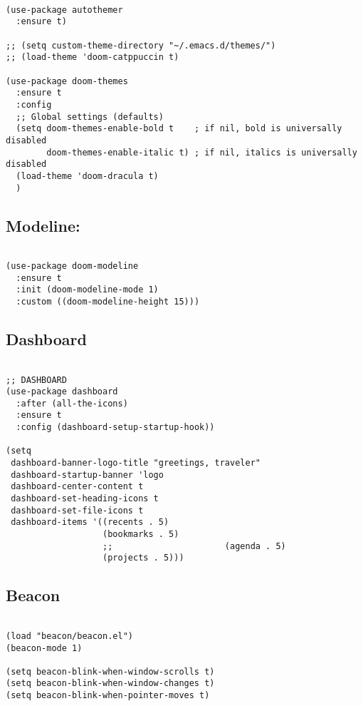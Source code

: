 \documentclass[11pt]{article}
\begin{document}
\begin{verbatim}

(use-package autothemer
  :ensure t)

;; (setq custom-theme-directory "~/.emacs.d/themes/")
;; (load-theme 'doom-catppuccin t)

(use-package doom-themes
  :ensure t
  :config
  ;; Global settings (defaults)
  (setq doom-themes-enable-bold t    ; if nil, bold is universally disabled
		doom-themes-enable-italic t) ; if nil, italics is universally disabled
  (load-theme 'doom-dracula t)
  )

\end{verbatim}

\subsection{Modeline:}
\label{sec:org02f56b0}

\begin{verbatim}

(use-package doom-modeline
  :ensure t
  :init (doom-modeline-mode 1)
  :custom ((doom-modeline-height 15)))

\end{verbatim}

\subsection{Dashboard}
\label{sec:org71d7e2f}

\begin{verbatim}

;; DASHBOARD
(use-package dashboard
  :after (all-the-icons)
  :ensure t
  :config (dashboard-setup-startup-hook))

(setq
 dashboard-banner-logo-title "greetings, traveler"
 dashboard-startup-banner 'logo
 dashboard-center-content t
 dashboard-set-heading-icons t
 dashboard-set-file-icons t
 dashboard-items '((recents . 5)
				   (bookmarks . 5)
				   ;;                      (agenda . 5)
				   (projects . 5)))

\end{verbatim}

\subsection{Beacon}
\label{sec:org69b1530}
\begin{verbatim}

(load "beacon/beacon.el")
(beacon-mode 1)

(setq beacon-blink-when-window-scrolls t)
(setq beacon-blink-when-window-changes t)
(setq beacon-blink-when-pointer-moves t)

\end{verbatim}
\end{document}

